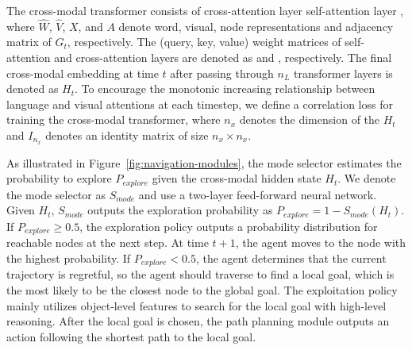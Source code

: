 \documentclass[10pt,twocolumn,letterpaper]{article}
\begin{document}
The cross-modal transformer consists of cross-attention layer   self-attention layer  
, where $\hat{W}$, $\hat{V}$, $X$, and $A$ denote word, visual, node representations and adjacency matrix of $G_t$, respectively. The (query, key, value) weight matrices of self-attention and cross-attention layers are denoted as \scalebox{0.9}{$(\Theta_q, \Theta_k, \Theta_v)$} and , respectively. The final cross-modal embedding at time $t$ after passing through $n_L$ transformer layers is denoted as $H_t$.
To encourage the monotonic increasing relationship between language and visual attentions at each timestep, we define a correlation loss  for training the cross-modal transformer, where $n_x$ denotes the dimension of the $H_t$ and $I_{n_x}$ denotes an identity matrix of size $n_x \times n_x$. 

As illustrated in Figure~\ref{fig:navigation-modules}, the mode selector estimates the probability to explore $P_{explore}$ given the cross-modal hidden state $H_t$. We denote the mode selector as $S_{mode}$ and use a two-layer feed-forward neural network. Given $H_t$, $S_{mode}$ outputs the exploration probability as $P_{explore} = 1-S_{mode}(H_t)$.
If $P_{explore}\geq0.5$, the exploration policy outputs a probability distribution for reachable nodes at the next step. At time $t+1$, the agent moves to the node with the highest probability. If $P_{explore}<0.5$, the agent determines that the current trajectory is regretful, so the agent should traverse to find a local goal, which is the most likely to be the closest node to the global goal. The exploitation policy mainly utilizes object-level features to search for the local goal with high-level reasoning. After the local goal is chosen, the path planning module outputs an action following the shortest path to the local goal.
\end{document}
